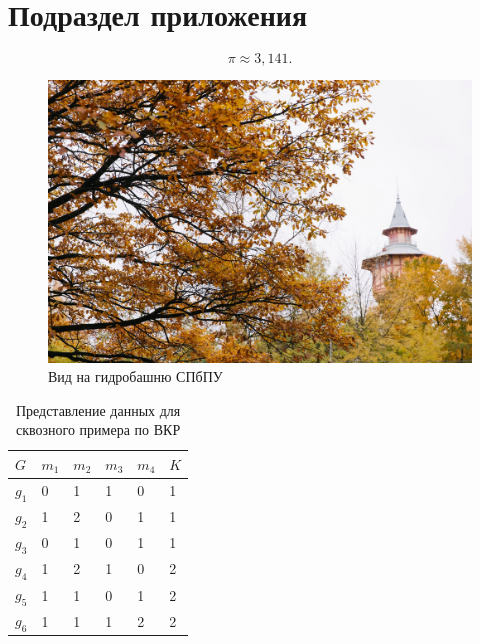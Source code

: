 \section{Подраздел приложения}\label{app-2-1}							


\begin{equation}%
\label{eq:Pi-app} %
\pi \approx 3,141.
\end{equation}
%
%
\begin{figure}[ht!] 
	\center
	\includegraphics [scale=0.27] {my_folder/images//spbpu_hydrotower}
	\caption{Вид на гидробашню СПбПУ \cite{spbpu-gallery}} 
	\label{fig:spbpu_hydrotower-app}  
\end{figure}

\begin{table} [htbp]%
	\centering\small
	\caption{Представление данных для сквозного примера по ВКР \cite{Peskov2004}}%
	\label{tab:ToyCompare-app}		
	\begin{tabular}{|l|l|l|l|l|l|}
		\hline
		$G$&$m_1$&$m_2$&$m_3$&$m_4$&$K$\\
		\hline
		$g_1$&0&1&1&0&1\\ \hline
		$g_2$&1&2&0&1&1\\ \hline
		$g_3$&0&1&0&1&1\\ \hline
		$g_4$&1&2&1&0&2\\ \hline
		$g_5$&1&1&0&1&2\\ \hline
		$g_6$&1&1&1&2&2\\ \hline		
	\end{tabular}	
	\normalsize%
\end{table}

